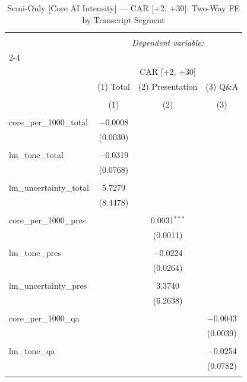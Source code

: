 
\begin{table}[!htbp] \centering 
  \caption{Semi-Only [Core AI Intensity] — CAR [+2, +30]: Two-Way FE by Transcript Segment} 
  \label{} 
\begin{tabular}{@{\extracolsep{5pt}}lccc} 
\\[-1.8ex]\hline 
\hline \\[-1.8ex] 
 & \multicolumn{3}{c}{\textit{Dependent variable:}} \\ 
\cline{2-4} 
\\[-1.8ex] & \multicolumn{3}{c}{CAR [+2, +30]} \\ 
 & (1) Total & (2) Presentation & (3) Q\&A \\ 
\\[-1.8ex] & (1) & (2) & (3)\\ 
\hline \\[-1.8ex] 
 core\_per\_1000\_total & $-$0.0008 &  &  \\ 
  & (0.0030) &  &  \\ 
  & & & \\ 
 lm\_tone\_total & $-$0.0319 &  &  \\ 
  & (0.0768) &  &  \\ 
  & & & \\ 
 lm\_uncertainty\_total & 5.7279 &  &  \\ 
  & (8.4478) &  &  \\ 
  & & & \\ 
 core\_per\_1000\_pres &  & 0.0031$^{***}$ &  \\ 
  &  & (0.0011) &  \\ 
  & & & \\ 
 lm\_tone\_pres &  & $-$0.0224 &  \\ 
  &  & (0.0264) &  \\ 
  & & & \\ 
 lm\_uncertainty\_pres &  & 3.3740 &  \\ 
  &  & (6.2638) &  \\ 
  & & & \\ 
 core\_per\_1000\_qa &  &  & $-$0.0043 \\ 
  &  &  & (0.0039) \\ 
  & & & \\ 
 lm\_tone\_qa &  &  & $-$0.0254 \\ 
  &  &  & (0.0782) \\ 
  & & & \\ 

\end{tabular}
\end{table}
